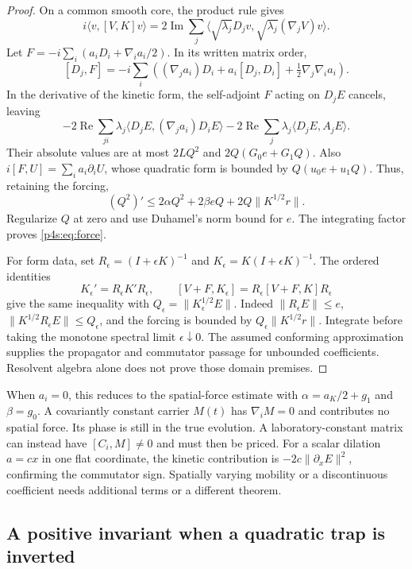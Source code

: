 \documentclass[11pt]{article}
\numberwithin{equation}{section}
\theoremstyle{definition}
\theoremstyle{remark}
\begin{document}
\begin{proof}
On a common smooth core, the product rule gives
\[
 i\langle v,[V,K]v\rangle
  =2\operatorname{Im}\sum_j
       \langle\sqrt{\lambda_j}D_jv,
                     \sqrt{\lambda_j}(\nabla_jV)v\rangle .
\]
Let $F=-i\sum_i(a_iD_i+\nabla_i a_i/2)$. In its written matrix order,
\[
 [D_j,F]=-i\sum_i
  \left((\nabla_ja_i)D_i+a_i[D_j,D_i]
                              +\tfrac12\nabla_j\nabla_i a_i\right).
\]
In the derivative of the kinetic form, the self-adjoint $F$ acting on
$D_jE$ cancels, leaving
\[
 -2\operatorname{Re}\sum_{ji}\lambda_j
       \langle D_jE,(\nabla_ja_i)D_iE\rangle
 -2\operatorname{Re}\sum_j\lambda_j\langle D_jE,A_jE\rangle .
\]
Their absolute values are at most $2LQ^2$ and
$2Q(G_0e+G_1Q)$. Also
$i[F,U]=\sum_i a_i\partial_iU$, whose quadratic form is bounded by
$Q(u_0e+u_1Q)$. Thus, retaining the forcing,
\[
 (Q^2)'\leq2\alpha Q^2+2\beta eQ
                         +2Q\|K^{1/2}r\|.
\]
Regularize $Q$ at zero and use Duhamel's norm bound for $e$.
The integrating factor proves \eqref{p4s:eq:force}.

For form data, set $R_\epsilon=(I+\epsilon K)^{-1}$ and
$K_\epsilon=K(I+\epsilon K)^{-1}$. The ordered identities
\[
 K_\epsilon'=R_\epsilon K'R_\epsilon,\qquad
 [V+F,K_\epsilon]=R_\epsilon[V+F,K]R_\epsilon
\]
give the same inequality with $Q_\epsilon=\|K_\epsilon^{1/2}E\|$.
Indeed $\|R_\epsilon E\|\leq e$,
$\|K^{1/2}R_\epsilon E\|\leq Q_\epsilon$, and the forcing is bounded
by $Q_\epsilon\|K^{1/2}r\|$. Integrate before taking the monotone
spectral limit $\epsilon\downarrow0$. The assumed conforming
approximation supplies the propagator and commutator passage for
unbounded coefficients. Resolvent algebra alone does not prove those
domain premises.
\end{proof}

When $a_i=0$, this reduces to the spatial-force estimate with
$\alpha=a_K/2+g_1$ and $\beta=g_0$. A covariantly constant carrier
$M(t)$ has $\nabla_iM=0$ and contributes no spatial force. Its phase
is still in the true evolution. A laboratory-constant matrix can instead
have $[C_i,M]\ne0$ and must then be priced. For a scalar dilation
$a=cx$ in one flat coordinate, the kinetic contribution is
$-2c\|\partial_xE\|^2$, confirming the commutator sign. Spatially
varying mobility or a discontinuous coefficient needs additional
terms or a different theorem.

\subsection{A positive invariant when a quadratic trap is inverted}
\end{document}
